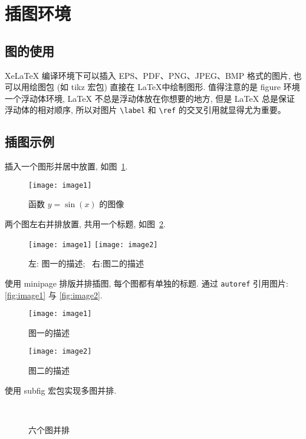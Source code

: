 

\clearpage
\section{插图环境}

\subsection{图的使用}

XeLaTeX 编译环境下可以插入 EPS、PDF、PNG、JPEG、BMP 格式的图片, 也可以用绘图包 (如 tikz 宏包) 直接在 \LaTeX 中绘制图形. 值得注意的是 figure 环境一个浮动体环境, LaTeX 不总是浮动体放在你想要的地方, 但是 LaTeX 总是保证浮动体的相对顺序, 所以对图片 \verb|\label| 和 \verb|\ref| 的交叉引用就显得尤为重要。

\subsection{插图示例}

插入一个图形并居中放置, 如图~\ref{fig:sinx}.
\begin{figure}[htp!]
  \centering
  \texttt{[image: image1]}
  \caption{函数 $y=\sin(x)$ 的图像}\label{fig:sinx}
\end{figure}

两个图左右并排放置, 共用一个标题, 如图~\ref{fig:image}.
\begin{figure}[htp!]
  \centering
  \texttt{[image: image1]}
  \hfill
  \texttt{[image: image2]}
  \caption{左: 图一的描述;~ 右:图二的描述}
  \label{fig:image}
\end{figure}

使用 minipage 排版并排插图, 每个图都有单独的标题. 通过 \verb|autoref| 引用图片: \autoref{fig:image1} 与 \autoref{fig:image2}.
\begin{figure}[htp!]
\begin{minipage}[t]{0.48\linewidth}
  \centering
  \texttt{[image: image1]}
  \caption{图一的描述}
  \label{fig:image1}
\end{minipage}
\hfill
\begin{minipage}[t]{0.48\linewidth}
  \centering
  \texttt{[image: image2]}
  \caption{图二的描述}
  \label{fig:image2}
\end{minipage}
\end{figure}


使用 subfig 宏包实现多图并排.
\begin{figure}[htp!]
\centering
{}
\hfill
{}
\hfill
{} \\
\hfill
{}
\hfill
{}
\caption{六个图并排}
\end{figure}


